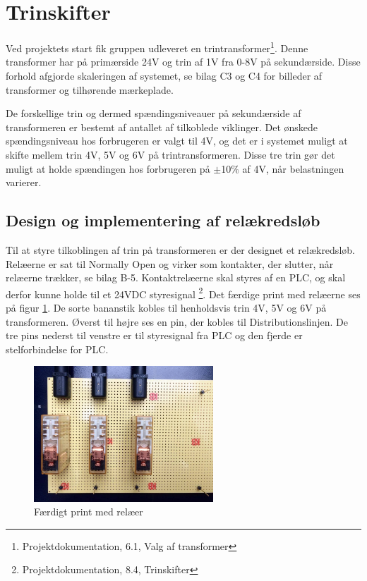 
\section{Trinskifter}
\label{sec:relae}
Ved projektets start fik gruppen udleveret en trintransformer\footnote{Projektdokumentation, 6.1, Valg af transformer}. Denne transformer har på primærside 24V og trin af 1V fra 0-8V på sekundærside. Disse forhold afgjorde skaleringen af systemet, se bilag C3 og C4 for billeder af transformer og tilhørende mærkeplade. 

De forskellige trin og dermed spændingsniveauer på sekundærside af transformeren er bestemt af antallet af tilkoblede viklinger. Det ønskede spændingsniveau hos forbrugeren er valgt til 4V, og det er i systemet muligt at skifte mellem trin 4V, 5V og 6V på trintransformeren. Disse tre trin gør det muligt at holde spændingen hos forbrugeren på $\pm$10$\%$ af 4V, når belastningen varierer.

\subsection{Design og implementering af relækredsløb}
Til at styre tilkoblingen af trin på transformeren er der designet et relækredsløb. Relæerne er sat til Normally Open og virker som kontakter, der slutter, når relæerne trækker, se bilag B-5. Kontaktrelæerne skal styres af en PLC, og skal derfor kunne holde til et 24VDC styresignal \footnote{Projektdokumentation, 8.4, Trinskifter}. Det færdige print med relæerne ses på figur \ref{fig:Relae}. De sorte bananstik kobles til henholdsvis trin 4V, 5V og 6V på transformeren. Øverst til højre ses en pin, der kobles til Distributionslinjen. De tre pins nederst til venstre er til styresignal fra PLC og den fjerde er stelforbindelse for PLC. 

\begin{figure}[H]
	\centering
	\includegraphics[width=0.6\textwidth]{figure/Relaekredsl}
	\caption{Færdigt print med relæer}
	\label{fig:Relae}
\end{figure}

